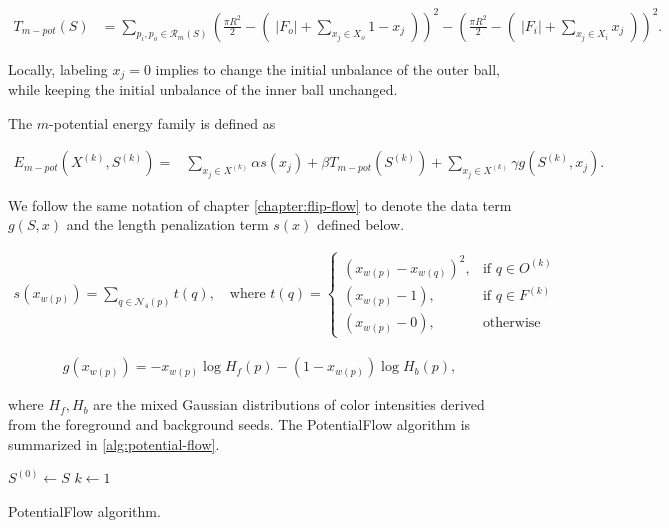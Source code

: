 \begin{align}
	T_{m-pot}(S) &= \sum_{p_i,p_o \in \mathcal{R}_m(S)}{( \frac{\pi R^2}{2} - (\; |F_o| + \sum_{ x_j \in X_o}{1-x_j} \; ) )^2 -(\frac{\pi R^2}{2} - (\; |F_i| + \sum_{x_j \in X_i}{x_j}\;))^2}.
	\label{eq:potential-term}
\end{align}

Locally, labeling $x_j=0$ implies to change the initial unbalance of the outer ball, while keeping the initial unbalance of the inner ball unchanged. 

The $m$-potential energy family is defined as

\begin{align}
  E_{m-pot}(X^{(k)},S^{(k)}) =& \sum_{x_j \in X^{(k)}}{\alpha s(x_j)} + \beta T_{m-pot}(S^{(k)}) + \sum_{x_j \in X^{(k)}}{\gamma g(S^{(k)},x_j)}.
  \label{eq:single-step-energy-family}
\end{align}

We follow the same notation of chapter \ref{chapter:flip-flow} to denote the data term $g(S,x)$ and the length penalization term $s(x)$ defined below. 

\begin{align}
  s(x_{w(p)})=\sum_{q \in \mathcal{N}_4(p)}{ t(q) }, \quad \text{where } t(q) = \left\{\begin{array}{ll}
  (x_{w(p)}-x_{w(q)})^2, & \text{if } q \in O^{(k)}\\
  (x_{w(p)}-1), & \text{if } q \in F^{(k)}\\
  (x_{w(p)}-0), & \text{otherwise }
  \end{array}\right.
  \label{eq:single-step-length-penalization}
\end{align}

\begin{align}
  g(x_{w(p)}) = -x_{w(p)}\log{H_f(p)} - (1-x_{w(p)})\log{H_b(p)},
  \label{eq:single-step-data-fidelity}
\end{align}	

where $H_f ,H_b $ are the mixed Gaussian distributions of color intensities derived from the foreground and background seeds. The PotentialFlow algorithm is summarized in \ref{alg:potential-flow}.

\begin{algorithm}
 
 \BlankLine
 $S^{(0)} \longleftarrow S$\;
 $k \longleftarrow 1$\;
 \caption{PotentialFlow algorithm.}
 \label{alg:potential-flow}  
\end{algorithm}


